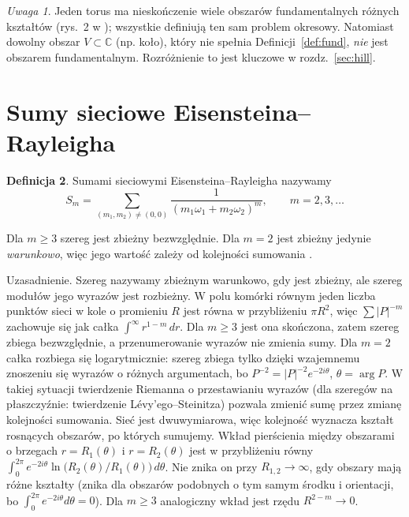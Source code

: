 \documentclass[12pt,a4paper,twoside,openright]{report}
\theoremstyle{definition}
\newtheorem{definicja}{Definicja}[chapter]
\theoremstyle{remark}
\newtheorem{uwaga}[definicja]{Uwaga}
\newcommand{\C}{\mathbb{C}}
\begin{document}
\begin{uwaga}
Jeden torus ma nieskończenie wiele obszarów fundamentalnych różnych kształtów (rys.~2 w \cite{czapla2025computational}); wszystkie definiują ten sam problem okresowy. Natomiast dowolny obszar $V\subset\C$ (np. koło), który nie spełnia Definicji~\ref{def:fund}, \emph{nie} jest obszarem fundamentalnym. Rozróżnienie to jest kluczowe w rozdz.~\ref{sec:hill}.
\end{uwaga}

\section{Sumy sieciowe Eisensteina--Rayleigha}\label{ssec:S}

\begin{definicja}\label{def:S}
Sumami sieciowymi Eisensteina--Rayleigha nazywamy
\begin{equation}\label{eq:Sm}
S_m=\sum_{(m_1,m_2)\ne(0,0)}\frac{1}{(m_1\omega_1+m_2\omega_2)^m},\qquad m=2,3,\dots
\end{equation}
\end{definicja}

Dla $m\ge3$ szereg jest zbieżny bezwzględnie. Dla $m=2$ jest zbieżny jedynie \emph{warunkowo}, więc jego wartość zależy od kolejności sumowania \cite{mityushev2025computationalpart3}.

Uzasadnienie. Szereg nazywamy zbieżnym warunkowo, gdy jest zbieżny, ale szereg modułów jego wyrazów jest rozbieżny. W polu komórki równym jeden liczba punktów sieci w kole o promieniu $R$ jest równa w przybliżeniu $\pi R^2$, więc $\sum|P|^{-m}$ zachowuje się jak całka $\int^{\infty} r^{1-m}\,dr$. Dla $m\ge3$ jest ona skończona, zatem szereg zbiega bezwzględnie, a przenumerowanie wyrazów nie zmienia sumy. Dla $m=2$ całka rozbiega się logarytmicznie: szereg zbiega tylko dzięki wzajemnemu znoszeniu się wyrazów o różnych argumentach, bo $P^{-2}=|P|^{-2}e^{-2i\theta}$, $\theta=\arg P$. W takiej sytuacji twierdzenie Riemanna o przestawianiu wyrazów (dla szeregów na płaszczyźnie: twierdzenie Lévy'ego--Steinitza) pozwala zmienić sumę przez zmianę kolejności sumowania. Sieć jest dwuwymiarowa, więc kolejność wyznacza kształt rosnących obszarów, po których sumujemy. Wkład pierścienia między obszarami o brzegach $r=R_1(\theta)$ i $r=R_2(\theta)$ jest w przybliżeniu równy $\int_0^{2\pi}e^{-2i\theta}\ln\bigl(R_2(\theta)/R_1(\theta)\bigr)\,d\theta$. Nie znika on przy $R_{1,2}\to\infty$, gdy obszary mają różne kształty (znika dla obszarów podobnych o tym samym środku i orientacji, bo $\int_0^{2\pi}e^{-2i\theta}d\theta=0$). Dla $m\ge3$ analogiczny wkład jest rzędu $R^{2-m}\to0$.
\end{document}

